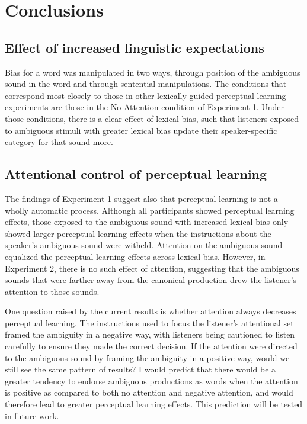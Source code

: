 
\chapter{Conclusions}

\section{Effect of increased linguistic expectations}

Bias for a word was manipulated in two ways, through position of the ambiguous sound in the word and through sentential manipulations.
The conditions that correspond most closely to those in other lexically-guided perceptual learning experiments \citep{Norris2003, Kraljic2005} are those in the No Attention condition of Experiment 1.
Under those conditions, there is a clear effect of lexical bias, such that listeners exposed to ambiguous stimuli with greater lexical bias update their speaker-specific category for that sound more.


\section{Attentional control of perceptual learning}

The findings of Experiment 1 suggest also that perceptual learning is not a wholly automatic process.  Although all participants showed perceptual learning effects, those exposed to the ambiguous sound with increased lexical bias only showed larger perceptual learning effects when the instructions about the speaker's ambiguous sound were witheld.  Attention on the ambiguous sound equalized the perceptual learning effects across lexical bias.
However, in Experiment 2, there is no such effect of attention, suggesting that the ambiguous sounds that were farther away from the canonical production drew the listener's attention to those sounds.

One question raised by the current results is whether attention always decreases perceptual learning.  
The instructions used to focus the listener's attentional set framed the ambiguity in a negative way, with listeners being cautioned to listen carefully to ensure they made the correct decision.  
If the attention were directed to the ambiguous sound by framing the ambiguity in a positive way, would we still see the same pattern of results?  
I would predict that there would be a greater tendency to endorse ambiguous productions as words when the attention is positive as compared to both no attention and negative attention, and would therefore lead to greater perceptual learning effects.  
This prediction will be tested in future work.

